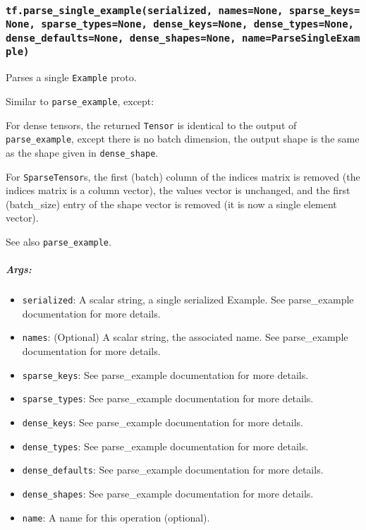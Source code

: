 \subsubsection{\texorpdfstring{\texttt{tf.parse\_single\_example(serialized,\ names=None,\ sparse\_keys=None,\ sparse\_types=None,\ dense\_keys=None,\ dense\_types=None,\ dense\_defaults=None,\ dense\_shapes=None,\ name=\textquotesingle{}ParseSingleExample\textquotesingle{})}
}{tf.parse\_single\_example(serialized, names=None, sparse\_keys=None, sparse\_types=None, dense\_keys=None, dense\_types=None, dense\_defaults=None, dense\_shapes=None, name='ParseSingleExample') }}\label{tf.parseux5fsingleux5fexampleserialized-namesnone-sparseux5fkeysnone-sparseux5ftypesnone-denseux5fkeysnone-denseux5ftypesnone-denseux5fdefaultsnone-denseux5fshapesnone-nameparsesingleexample}

Parses a single \texttt{Example} proto.

Similar to \texttt{parse\_example}, except:

For dense tensors, the returned \texttt{Tensor} is identical to the
output of \texttt{parse\_example}, except there is no batch dimension,
the output shape is the same as the shape given in
\texttt{dense\_shape}.

For \texttt{SparseTensor}s, the first (batch) column of the indices
matrix is removed (the indices matrix is a column vector), the values
vector is unchanged, and the first (batch\_size) entry of the shape
vector is removed (it is now a single element vector).

See also \texttt{parse\_example}.

\subparagraph{Args: }\label{args-46}

\begin{itemize}
\tightlist
\item
  \texttt{serialized}: A scalar string, a single serialized Example. See
  parse\_example documentation for more details.
\item
  \texttt{names}: (Optional) A scalar string, the associated name. See
  parse\_example documentation for more details.
\item
  \texttt{sparse\_keys}: See parse\_example documentation for more
  details.
\item
  \texttt{sparse\_types}: See parse\_example documentation for more
  details.
\item
  \texttt{dense\_keys}: See parse\_example documentation for more
  details.
\item
  \texttt{dense\_types}: See parse\_example documentation for more
  details.
\item
  \texttt{dense\_defaults}: See parse\_example documentation for more
  details.
\item
  \texttt{dense\_shapes}: See parse\_example documentation for more
  details.
\item
  \texttt{name}: A name for this operation (optional).
\end{itemize}

